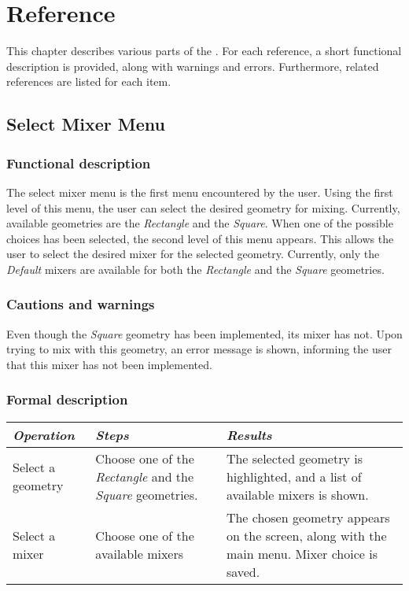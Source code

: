 \chapter{Reference}
This chapter describes various parts of the \applicationname{}. For each reference, a short functional description is provided, along with warnings and errors. Furthermore, related references are listed for each item.

\section{Select Mixer Menu}
\label{sec:cellBrows}
  \subsection*{Functional description}
  The select mixer menu is the first menu encountered by the user. Using the first level of this menu, the user can select the desired geometry for mixing. Currently, available geometries are the \emph{Rectangle} and the \emph{Square}. When one of the possible choices has been selected, the second level of this menu appears. This allows the user to select the desired mixer for the selected geometry. Currently, only the \emph{Default} mixers are available for both the \emph{Rectangle} and the \emph{Square} geometries.
 
  \subsection*{Cautions and warnings}
  Even though the \emph{Square} geometry has been implemented, its mixer has not. Upon trying to mix with this geometry, an error message is shown, informing the user that this mixer has not been implemented.

  \subsection*{Formal description}
  \begin{tabularx}{\textwidth}{XXX}
    \toprule
    \emph{Operation} & \emph{Steps} & \emph{Results} \\
    \midrule
    Select a geometry & Choose one of the \emph{Rectangle} and the \emph{Square} geometries. & The selected geometry is highlighted, and a list of available mixers is shown. \\
    \midrule
    Select a mixer & Choose one of the available mixers & The chosen geometry appears on the screen, along with the main menu. Mixer choice is saved. \\
    \bottomrule
  \end{tabularx}

